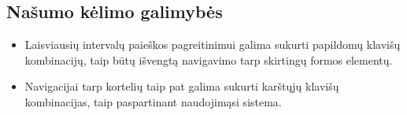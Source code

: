 \subsection{Našumo kėlimo galimybės}
\begin{itemize}
  \item Laisviausių intervalų paieškos pagreitinimui galima sukurti papildomų klavišų kombinacijų, taip būtų išvengtą navigavimo tarp skirtingų formos elementų.
  \item Navigacijai tarp kortelių taip pat galima sukurti karštųjų klavišų kombinacijas, taip
  paspartinant naudojimąsi sistema.
\end{itemize}

